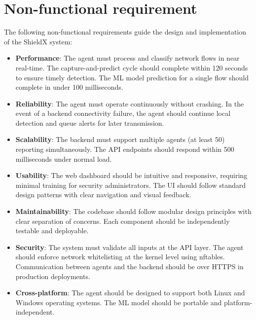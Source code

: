 \documentclass[../Main.tex]{subfiles}
\begin{document}
\section{Non-functional requirement}
\label{section:2.5}

The following non-functional requirements guide the design and implementation of the ShieldX system:

\begin{itemize}
    \item \textbf{Performance}: The agent must process and classify network flows in near real-time. The capture-and-predict cycle should complete within 120 seconds to ensure timely detection. The ML model prediction for a single flow should complete in under 100 milliseconds.
    \item \textbf{Reliability}: The agent must operate continuously without crashing. In the event of a backend connectivity failure, the agent should continue local detection and queue alerts for later transmission.
    \item \textbf{Scalability}: The backend must support multiple agents (at least 50) reporting simultaneously. The API endpoints should respond within 500 milliseconds under normal load.
    \item \textbf{Usability}: The web dashboard should be intuitive and responsive, requiring minimal training for security administrators. The UI should follow standard design patterns with clear navigation and visual feedback.
    \item \textbf{Maintainability}: The codebase should follow modular design principles with clear separation of concerns. Each component should be independently testable and deployable.
    \item \textbf{Security}: The system must validate all inputs at the API layer. The agent should enforce network whitelisting at the kernel level using nftables. Communication between agents and the backend should be over HTTPS in production deployments.
    \item \textbf{Cross-platform}: The agent should be designed to support both Linux and Windows operating systems. The ML model should be portable and platform-independent.
\end{itemize}
\end{document}
